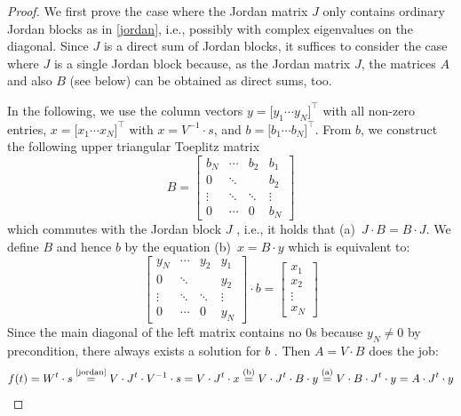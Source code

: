\documentclass[twoside,11pt]{article}
\theoremstyle{definition}
\begin{document}
\begin{proof}
We first prove the case where the Jordan matrix $J$ only contains ordinary
Jordan blocks as in \cref{jordan}, i.e., possibly with complex eigenvalues
on the diagonal. Since $J$ is a direct sum of Jordan blocks, it suffices to
consider the case where $J$ is a single Jordan block because, as the Jordan
matrix $J$, the matrices $A$ and also $B$ (see below) can be obtained as direct
sums, too.

In the following, we use the column vectors $y = \big[ y_1 \cdots y_N
\big]^\top$ with all non-zero entries, $x = \big[ x_1 \cdots x_N \big]^\top$
with $x = V^{-1} \cdot s$, and $b = \big[ b_1 \cdots b_N \big]^\top$. From $b$,
we construct the following upper triangular Toeplitz matrix
\[ B = \left[ \begin{array}{*{4}{c}}
  b_N & \cdots & b_2 & b_1\\
  0 & \ddots & & b_2\\
  \vdots & \ddots & \ddots & \vdots\\
  0 & \cdots & 0 & b_N
\end{array} \right] \]
which commutes with the Jordan block $J$ \cite[Sect.~3.2.4]{HJ13}, i.e., it
holds that (a)~$J \cdot B = B \cdot J$. We define $B$ and hence $b$ by the
equation (b)~$x = B \cdot y$ which is
equivalent to:
\[ \left[ \begin{array}{*{4}{c}}
  y_N & \cdots & y_2 & y_1\\
  0 & \ddots & & y_2\\
  \vdots & \ddots & \ddots & \vdots\\
  0 & \cdots & 0 & y_N
\end{array} \right] \cdot b = \left[ \begin{array}{c}
  x_1\\[7pt] x_2\\ \vdots\\ x_N
\end{array} \right] \]
Since the main diagonal of the left matrix contains no $0$s because $y_N \neq 0$
by precondition, there always exists a solution for $b$ \cite[Sect.~0.9.3]{HJ13}.
Then $A = V \cdot B$ does the job:
\[ f(t) = W^t \cdot s
	\overset{\text{\cref{jordan}}}{=} V \cdot J^t \cdot V^{-1} \cdot s
	= V \cdot J^t \cdot x
	\overset{\text{(b)}}{=} V \cdot J^t \cdot B \cdot y
	\overset{\text{(a)}}{=} V \cdot B \cdot J^t \cdot y
	= A \cdot J^t \cdot y
\]


\end{proof}
\end{document}
